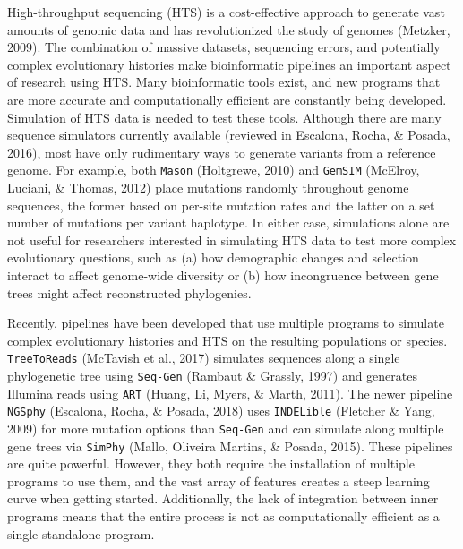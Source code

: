 \documentclass[12pt,]{article}
\begin{document}
High-throughput sequencing (HTS) is a cost-effective approach to generate vast amounts
of genomic data and has revolutionized the study of genomes
(Metzker, 2009).
The combination of massive datasets, sequencing errors, and potentially complex
evolutionary histories make bioinformatic pipelines an important aspect of
research using HTS.
Many bioinformatic tools exist, and new programs that are more accurate and
computationally efficient are constantly being developed.
Simulation of HTS data is needed to test these tools.
Although there are many sequence simulators currently available
(reviewed in Escalona, Rocha, \& Posada, 2016),
most have only rudimentary ways to generate variants from a reference genome.
For example, both \texttt{Mason} (Holtgrewe, 2010) and \texttt{GemSIM} (McElroy, Luciani, \& Thomas, 2012) place mutations
randomly throughout genome sequences, the former based on per-site mutation rates
and the latter on a set number of mutations per variant haplotype.
In either case, simulations alone are not useful for researchers interested
in simulating HTS data to test more complex evolutionary questions, such as
(a) how demographic changes and selection interact to affect genome-wide diversity or
(b) how incongruence between gene trees might affect reconstructed phylogenies.

Recently, pipelines have been developed that use multiple programs
to simulate complex evolutionary histories and HTS on the resulting populations
or species.
\texttt{TreeToReads} (McTavish et al., 2017) simulates sequences along a single
phylogenetic tree using \texttt{Seq-Gen} (Rambaut \& Grassly, 1997)
and generates Illumina reads using \texttt{ART} (Huang, Li, Myers, \& Marth, 2011).
The newer pipeline \texttt{NGSphy} (Escalona, Rocha, \& Posada, 2018) uses \texttt{INDELible} (Fletcher \& Yang, 2009)
for more mutation options than \texttt{Seq-Gen} and
can simulate along multiple gene trees via \texttt{SimPhy} (Mallo, Oliveira Martins, \& Posada, 2015).
These pipelines are quite powerful.
However, they both require the installation of multiple programs to use them,
and the vast array of features creates a steep learning curve when getting started.
Additionally, the lack of integration between inner programs means that the
entire process is not as computationally efficient as a single standalone program.
\end{document}
